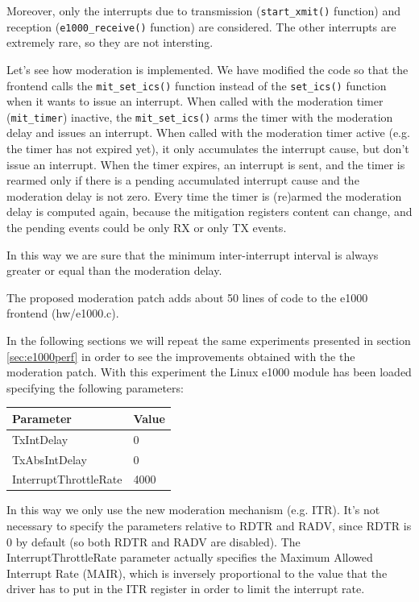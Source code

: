 Moreover, only the interrupts due to transmission (\texttt{start\_xmit()} function) and reception (\texttt{e1000\_receive()}
function) are considered. The other interrupts are extremely rare, so they are not intersting.


\vspace{0.5cm}
Let's see how moderation is implemented. We have modified the code so that the frontend calls the \texttt{mit\_set\_ics()} function instead
of the \texttt{set\_ics()} function when it wants to issue an interrupt.
When called with the moderation timer (\texttt{mit\_timer}) inactive, the \texttt{mit\_set\_ics()} arms the timer with the moderation delay
and issues  an interrupt.
When called with the moderation timer active (e.g. the timer has not expired yet), it only accumulates the interrupt cause, but don't issue 
an interrupt.
When the timer expires, an interrupt is sent, and the timer is rearmed only if there is a pending accumulated interrupt cause and
the moderation delay is not zero.
Every time the timer is (re)armed the moderation delay is computed again, because the mitigation registers content can change, and
the pending events could be only RX or only TX events.

In this way we are sure that the minimum inter-interrupt interval is always greater or equal than the moderation delay.

\vspace{0.5cm}

The proposed moderation patch adds about 50 lines of code to the e1000 frontend (hw/e1000.c).

\vspace{0.5cm}

In the following sections we will repeat the same experiments presented in section \ref{sec:e1000perf} in order to see the improvements
obtained with the the moderation patch. With this experiment the Linux e1000 module has been loaded specifying the following parameters:
\begin{center}
\begin{tabular}{ll}
\toprule
\textbf{Parameter} & \textbf{Value}\\
\midrule
TxIntDelay & 0\\
TxAbsIntDelay & 0\\
InterruptThrottleRate & 4000\\
\bottomrule
\end{tabular}
\end{center}

In this way we only use the new moderation mechanism (e.g. ITR). It's not necessary to specify the parameters relative to RDTR and
RADV, since RDTR is 0 by default (so both RDTR and RADV are disabled). The InterruptThrottleRate parameter actually specifies the Maximum
Allowed Interrupt Rate (MAIR), which is inversely proportional to the value that the driver has to put in the ITR register in order to limit
the interrupt rate.

